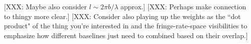 \documentclass[twocolumn,apj,numberedappendix]{emulateapj}
\newcommand{\x}{\mathbf{x}}
\begin{document}
[XXX: Maybe also consider $l \sim 2 \pi b / \lambda$ approx.]
[XXX: Perhaps make connection to thingy more clear.]
[XXX: Consider also playing up the weights as the ``dot product" of the thing you're interested in and the fringe-rate-space visibilities to emphasize how different baselines just need to combined based on their overlap.]
%
%
%
\end{document}

